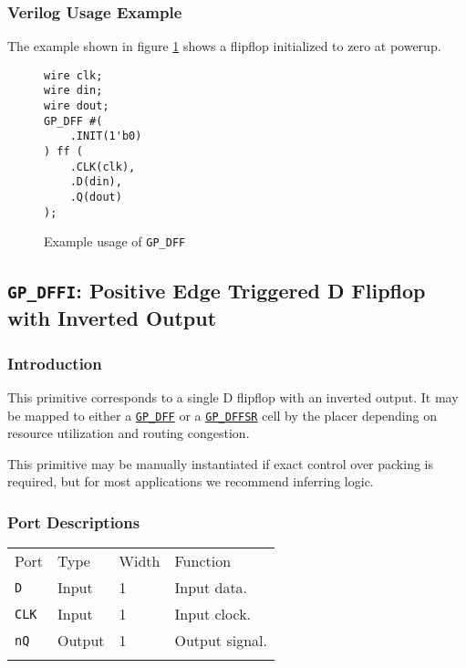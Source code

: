 \documentclass[11pt]{article}
\newcommand{\tokenstyle}[1]{\texttt{#1}}
\newcommand{\whenstyle}[1]{{\fontseries{sb}\selectfont#1}}
\newcommand{\tokenref}[2]{\hyperref[#2]{\tokenstyle{#1}}}
\newcommand{\thinhline}{\Xhline{1\arrayrulewidth}}
\newcommand{\thickhline}{\Xhline{2.5\arrayrulewidth}}
\begin{document}
\subsubsection{Verilog Usage Example}

The example shown in figure \ref{gp-dff-example} shows a flipflop initialized to zero at powerup.

\begin{figure}[h]
\begin{lstlisting}
wire clk;
wire din;
wire dout;
GP_DFF #(
	.INIT(1'b0)
) ff (
	.CLK(clk),
	.D(din),
	.Q(dout)
);
\end{lstlisting}
\caption{Example usage of \tokenstyle{GP\_DFF}}
\label{gp-dff-example}
\end{figure}


\pagebreak
\subsection{\tokenstyle{GP\_DFFI}: Positive Edge Triggered D Flipflop with Inverted Output}
\label{gp-dff}

\subsubsection{Introduction}
This primitive corresponds to a single D flipflop with an inverted output. It may be mapped to either a 
\tokenref{GP\_DFF}{gp-dff} or a \tokenref{GP\_DFFSR}{gp-dffsr} cell by the placer depending on resource utilization and 
routing congestion.

This primitive may be manually instantiated if exact control over packing is required, but for most applications we
recommend inferring logic.

\subsubsection{Port Descriptions}

\begin{tabularx}{\textwidth}{lllX}
\thinhline
\whenstyle{Port} & \whenstyle{Type} & \whenstyle{Width} & \whenstyle{Function} \\
\thickhline
\tokenstyle{D} & Input & 1 & Input data. \\
\thinhline
\tokenstyle{CLK} & Input & 1 & Input clock. \\
\thinhline
\tokenstyle{nQ} & Output & 1 & Output signal. \\
\thinhline
\end{tabularx}
\end{document}

